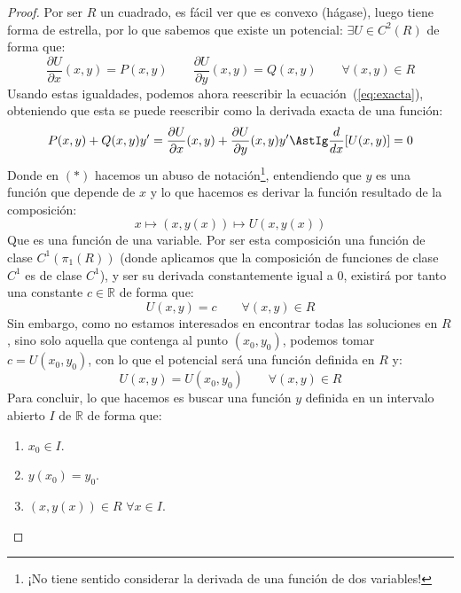 \begin{prop}
\begin{proof}
        Por ser $R$ un cuadrado, es fácil ver que es convexo (hágase), luego tiene forma de estrella, por lo que sabemos que existe un potencial: $\exists U\in C^2(R)$ de forma que:
        \begin{equation*}
            \dfrac{\partial U}{\partial x}(x,y) = P(x,y) \qquad \dfrac{\partial U}{\partial y}(x,y) = Q(x,y) \qquad \forall (x,y)\in R
        \end{equation*}
        Usando estas igualdades, podemos ahora reescribir la ecuación~(\ref{eq:exacta}), obteniendo que esta se puede reescribir como la derivada exacta de una función:
        \begin{equation*}
            P(x,y)+Q(x,y)y' = \dfrac{\partial U}{\partial x}(x,y) + \dfrac{\partial U}{\partial y}(x,y)y' \AstIg \dfrac{d}{dx}[U(x,y)] = 0
        \end{equation*}
        Donde en $(\ast)$ hacemos un abuso de notación\footnote{¡No tiene sentido considerar la derivada de una función de dos variables!}, entendiendo que $y$ es una función que depende de $x$ y lo que hacemos es derivar la función resultado de la composición:
        \begin{equation*}
            x \longmapsto (x,y(x)) \longmapsto U(x,y(x))
        \end{equation*}
        Que es una función de una variable. Por ser esta composición una función de clase $C^1(\pi_1(R))$ (donde aplicamos que la composición de funciones de clase $C^1$ es de clase $C^1$), y ser su derivada constantemente igual a 0, existirá por tanto una constante $c\in \mathbb{R}$ de forma que:
        \begin{equation*}
            U(x,y) = c \qquad \forall (x,y)\in R
        \end{equation*}
        Sin embargo, como no estamos interesados en encontrar todas las soluciones en $R$, sino solo aquella que contenga al punto $(x_0,y_0)$, podemos tomar $c=U(x_0,y_0)$, con lo que el potencial será una función definida en $R$ y:
        \begin{equation*}
            U(x,y) = U(x_0,y_0) \qquad \forall (x,y)\in R
        \end{equation*}
        Para concluir, lo que hacemos es buscar una función $y$ definida en un intervalo abierto $I$ de $\mathbb{R}$ de forma que:
        \begin{enumerate}
            \item $x_0\in I$.
            \item $y(x_0)=y_0$.
            \item $(x,y(x))\in R$ $\forall x\in I$.

\end{enumerate}
\end{proof}
\end{prop}
